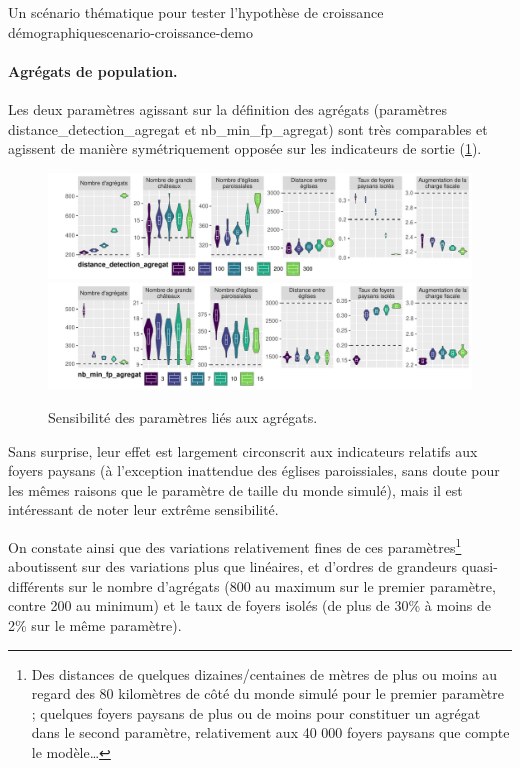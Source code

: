 \begin{encadre}{Un scénario thématique pour tester l'hypothèse de croissance démographique}{scenario-croissance-demo}
\smallskip
\end{encadre}

\paragraph{Agrégats de population.}

Les deux paramètres agissant sur la définition des agrégats (paramètres \textsf{distance\_detection\_agregat} et \textsf{nb\_min\_fp\_agregat}) sont très comparables et agissent de manière symétriquement opposée sur les indicateurs de sortie (\cref{fig:sensib-agregats}).

\begin{figure}[H]
	\centering
	\includegraphics[width=\linewidth]{img/sensib/sensibilite_distance_detection_agregat.pdf}
	\includegraphics[width=\linewidth]{img/sensib/sensibilite_nb_min_fp_agregat.pdf}
	\caption{Sensibilité des paramètres liés aux agrégats.}
	\label{fig:sensib-agregats}
\end{figure}

Sans surprise, leur effet est largement circonscrit aux indicateurs relatifs aux foyers paysans (à l'exception inattendue des églises paroissiales, sans doute pour les mêmes raisons que le paramètre de taille du monde simulé), mais il est intéressant de noter leur extrême sensibilité.

On constate ainsi que des variations relativement fines de ces paramètres\footnote{
	Des distances de quelques dizaines/centaines de mètres de plus ou moins au regard des 80 kilomètres de côté du monde simulé pour le premier paramètre ; quelques foyers paysans de plus ou de moins pour constituer un agrégat dans le second paramètre, relativement aux 40 000 foyers paysans que compte le modèle\ldots
} aboutissent sur des variations plus que linéaires, et d'ordres de grandeurs quasi-différents sur le nombre d'agrégats (800 au maximum sur le premier paramètre, contre 200 au minimum) et le taux de foyers isolés (de plus de 30\% à moins de 2\% sur le même paramètre).

